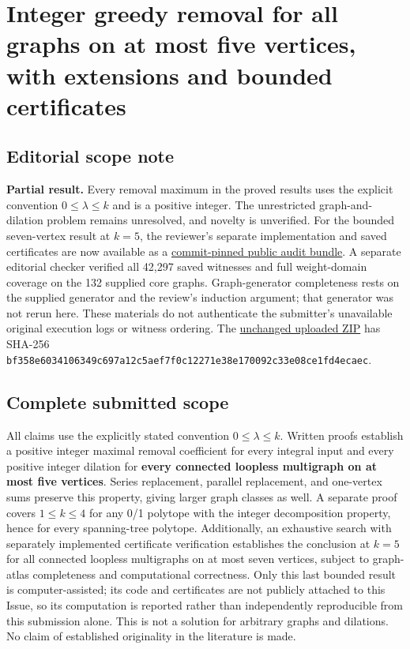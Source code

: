 \documentclass{article}
\begin{document}
\section{Integer greedy removal for all graphs on at most five vertices, with extensions and bounded certificates}

\subsection{Editorial scope note}

\textbf{Partial result.} Every removal maximum in the proved results uses the explicit convention \(0\le\lambda\le k\) and is a positive integer. The unrestricted graph-and-dilation problem remains unresolved, and novelty is unverified. For the bounded seven-vertex result at \(k=5\), the reviewer's separate implementation and saved certificates are now available as a \href{https://github.com/We-Solve/research/tree/be66280dbd02bb4e9b0fc5f6eafab544ccfb27b5/audits/issue-17}{commit-pinned public audit bundle}. A separate editorial checker verified all 42,297 saved witnesses and full weight-domain coverage on the 132 supplied core graphs. Graph-generator completeness rests on the supplied generator and the review's induction argument; that generator was not rerun here. These materials do not authenticate the submitter's unavailable original execution logs or witness ordering. The \href{https://github.com/We-Solve/research/raw/be66280dbd02bb4e9b0fc5f6eafab544ccfb27b5/audits/issue-17/issue17-audit.zip}{unchanged uploaded ZIP} has SHA-256 \texttt{bf358e6034106349c697a12c5aef7f0c12271e38e170092c33e08ce1fd4ecaec}.

\subsection{Complete submitted scope}

All claims use the explicitly stated convention \(0\le\lambda\le k\). Written proofs establish a positive integer maximal removal coefficient for every integral input and every positive integer dilation for \textbf{every connected loopless multigraph on at most five vertices}. Series replacement, parallel replacement, and one-vertex sums preserve this property, giving larger graph classes as well. A separate proof covers \(1\le k\le4\) for any 0/1 polytope with the integer decomposition property, hence for every spanning-tree polytope. Additionally, an exhaustive search with separately implemented certificate verification establishes the conclusion at \(k=5\) for all connected loopless multigraphs on at most seven vertices, subject to graph-atlas completeness and computational correctness. Only this last bounded result is computer-assisted; its code and certificates are not publicly attached to this Issue, so its computation is reported rather than independently reproducible from this submission alone. This is not a solution for arbitrary graphs and dilations. No claim of established originality in the literature is made.
\end{document}
